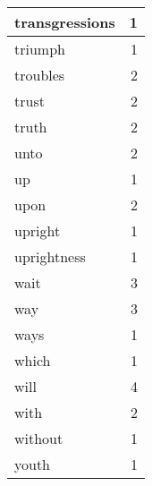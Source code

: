 \begin{center}
\begin{longtable}{l|r}
transgressions & 1 \\ \hline
triumph & 1 \\ \hline
troubles & 2 \\ \hline
trust & 2 \\ \hline
truth & 2 \\ \hline
unto & 2 \\ \hline
up & 1 \\ \hline
upon & 2 \\ \hline
upright & 1 \\ \hline
uprightness & 1 \\ \hline
wait & 3 \\ \hline
way & 3 \\ \hline
ways & 1 \\ \hline
which & 1 \\ \hline
will & 4 \\ \hline
with & 2 \\ \hline
without & 1 \\ \hline
youth & 1 \\ \hline
\end{longtable}
\end{center}



\normalsize



